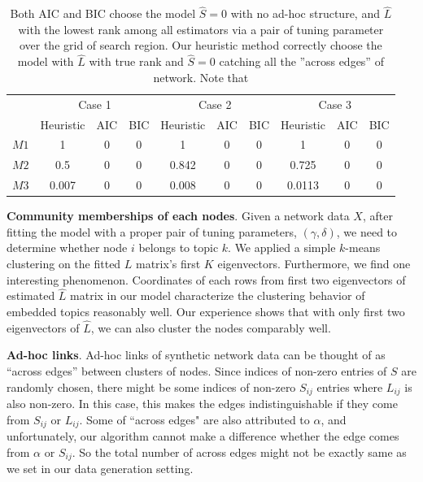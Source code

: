 \documentclass[AMS,STIX1COL]{WileyNJD-v2}
\begin{document}
\begin{table}[htbp]
\centering
\begin{tabular}{c|ccc|ccc|ccc}
   & \multicolumn{3}{c|}{Case 1} & \multicolumn{3}{c|}{Case 2} & \multicolumn{3}{c}{Case 3} \\ \cline{2-10}
   & Heuristic        & AIC    & BIC    & Heuristic        & AIC    & BIC    & Heuristic        & AIC    & BIC   \\ \hline
$M1$ & 1         & 0      & 0      & 1         & 0      & 0      & 1         & 0      & 0     \\
$M2$ & 0.5       & 0      & 0      & 0.842     & 0      & 0      & 0.725     & 0      & 0     \\
$M3$ & 0.007     & 0      & 0      & 0.008     & 0      & 0      & 0.0113    & 0      & 0
\end{tabular}
\caption{ Both AIC and BIC choose the model $\widehat{S}=0$ with no ad-hoc structure, and $\widehat{L}$ with the lowest rank among all estimators via a pair of tuning parameter over the grid of search region. Our heuristic method correctly choose the model with $\widehat{L}$ with true rank and $\widehat{S}=0$ catching all the ''across edges'' of network. Note that }
\label{tab:table1}
\end{table}


\textbf{Community memberships of each nodes}.
Given a network data $X$, after fitting the model with a proper pair of tuning parameters, $(\gamma,\delta)$, we need to determine whether node $i$ belongs to topic $k$.
We applied a simple $k$-means clustering on the fitted $L$ matrix's first $K$ eigenvectors.
Furthermore, we find one interesting phenomenon.
Coordinates of each rows from first two eigenvectors of estimated $\widehat{L}$ matrix in our model characterize the clustering behavior of embedded topics reasonably well.
Our experience shows that with only first two eigenvectors of $\widehat{L}$, we can also cluster the nodes comparably well.

\textbf{Ad-hoc links}.
Ad-hoc links of synthetic network data can be thought of as ``across edges'' between clusters of nodes.
Since indices of non-zero entries of $S$ are randomly chosen, there might be some indices of non-zero $S_{ij}$ entries where $L_{ij}$ is also non-zero.
In this case, this makes the edges indistinguishable if they come from $S_{ij}$ or $L_{ij}$.
Some of ``across edges" are also attributed to $\alpha$, and unfortunately, our algorithm cannot make a difference whether the edge comes from $\alpha$ or $S_{ij}$.
So the total number of across edges might not be exactly same as we set in our data generation setting.
\end{document}
